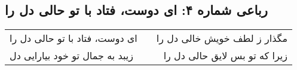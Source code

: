 \begin{center}
\section*{رباعی شماره ۴: ای دوست، فتاد با تو حالی دل را}
\label{sec:004}
\begin{longtable}{l p{0.5cm} r}
ای دوست، فتاد با تو حالی دل را
&&
مگذار ز لطف خویش خالی دل را
\\
زیبد به جمال تو خود بیارایی دل
&&
زیرا که تو بس لایق حالی دل را
\\
\end{longtable}
\end{center}
